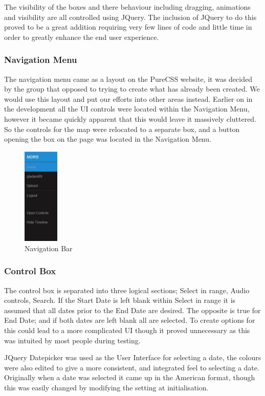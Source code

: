\documentclass{l3proj}
\begin{document}
The visibility of the boxes and there behaviour including
dragging, animations and visibility are all controlled using
JQuery. The inclusion of JQuery to do this proved to be a great
addition requiring very few lines of code and little time in order to
greatly enhance the end user experience.

\subsubsection{Navigation Menu}

The navigation menu came as a layout on the PureCSS website, it was
decided by the group that opposed to trying to create what has already
been created. We would use this layout and put our efforts into other
areas instead. Earlier on in the development all the UI controls were
located within the Navigation Menu, however it became quickly apparent
that this would leave it massively cluttered. So the controls for the
map were relocated to a separate box, and a button opening the box on
the page was located in the Navigation Menu. 
\begin{figure}[ht!]
  \centering
\includegraphics[width=0.15\textwidth]{images/nav-bar.jpg}
\caption{Navigation Bar}
\end{figure}

\subsubsection{Control Box}
The control box is separated into three logical sections; Select in
range, Audio controls, Search. If the Start Date is left blank within
Select in range it is assumed that all dates prior to the End Date are
desired. The opposite is true for End Date; and if both dates are left
blank all are selected. To create options for this could lead to a
more complicated UI though it proved unnecessary as this was intuited
by most people during testing.

JQuery Datepicker was used as the User Interface for selecting a date,
the colours were also edited to give a more consistent, and integrated
feel to selecting a date. Originally when a date was selected it came
up in the American format, though this was easily changed by modifying
the setting at initialisation. 
\end{document}
